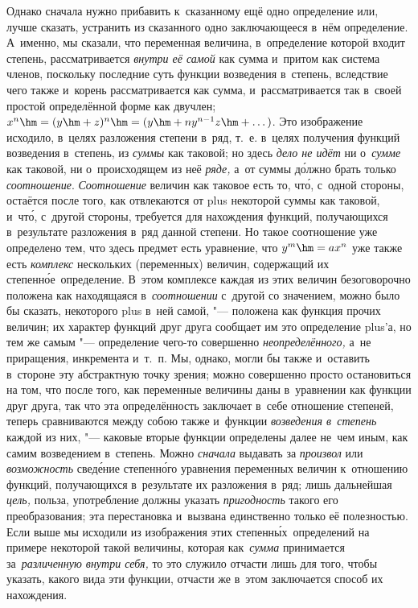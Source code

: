 Однако сначала нужно прибавить к~сказанному ещё одно определение или, лучше
сказать, устранить из сказанного одно заключающееся в~нём определение.
А~именно, мы сказали, что переменная величина, в~определение которой входит
степень, рассматривается {\em внутри её самой} как сумма и~притом как система
членов, поскольку последние суть функции возведения в~степень, вследствие чего
также и~корень рассматривается как сумма, и~рассматривается так в~своей простой
определённой форме как двучлен;
$x^n\hm=(y\hm+z)^n\hm=(y\hm+ny^{n-1}z\hm+\dots)$. Это изображение исходило,
в~целях разложения степени в~ряд, т.~е. в~целях получения функций возведения
в~степень, из {\em суммы} как таковой; но здесь {\em дело не идёт} ни
о~{\em сумме} как таковой, ни о~происходящем из неё {\em ряде,} а~от суммы
д\'{о}лжно брать только {\em соотношение}. {\em Соотношение} величин как
таковое есть то, чт\'{о}, с~одной стороны, остаётся после того, как отвлекаются от
plus некоторой суммы как таковой, и~чт\'{о}, с~другой стороны, требуется для
нахождения функций, получающихся в~результате разложения в~ряд данной степени.
Но такое соотношение уже определено тем, что здесь предмет есть уравнение, что
$y^m\hm=ax^n$ уже также есть {\em комплекс} нескольких (переменных) величин,
содержащий их степенн\'{о}е~определение. В~этом комплексе каждая из этих
величин безоговорочно положена как находящаяся в~{\em соотношении} с~другой со
значением, можно было бы сказать, некоторого plus в~ней самой, "--- положена
как функция прочих величин; их характер функций друг друга сообщает им это
определение plus'а, но тем же самым "--- определение чего-то совершенно
{\em неопределённого,} а~не приращения, инкремента и~т.~п. Мы, однако, могли бы
также и~оставить в~стороне эту абстрактную точку зрения; можно совершенно
просто остановиться на том, что после того, как переменные величины даны
в~уравнении как функции друг друга, так что эта определённость заключает в~себе
отношение степеней, теперь сравниваются между собою также и~функции
{\em возведения в~степень} каждой из них, "--- каковые вторые функции
определены далее не~чем иным, как самим возведением в~степень. Можно
{\em сначала} выдавать за {\em произвол} или {\em возможность} свед\'{е}ние
степенн\'{о}го уравнения переменных величин к~отношению функций, получающихся
в~результате их разложения в~ряд; лишь дальнейшая {\em цель,} польза,
употребление должны указать {\em пригодность} такого его преобразования; эта
перестановка и~вызвана единственно только её полезностью. Если выше мы исходили
из изображения этих степенн\'{ы}х~определений на примере некоторой такой величины,
которая как~{\em сумма} принимается за~{\em различенную внутри себя,} то это
служило отчасти лишь для того, чтобы указать, какого вида эти функции, отчасти
же в~этом заключается способ их нахождения.

